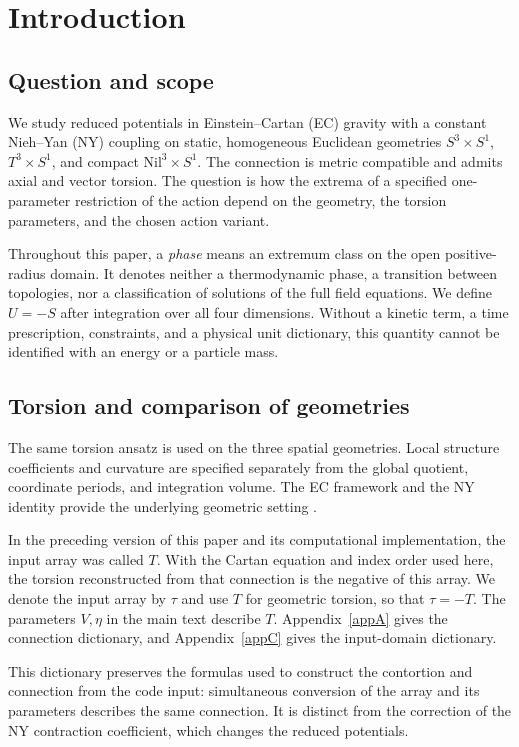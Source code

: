 \section{Introduction}\label{sec1}
\subsection{Question and scope}
We study reduced potentials in Einstein--Cartan (EC) gravity with a constant
Nieh--Yan (NY) coupling on static, homogeneous Euclidean geometries
$S^3\times S^1$, $T^3\times S^1$, and compact $\mathrm{Nil}^3\times S^1$.
The connection is metric compatible and admits axial and vector torsion.
The question is how the extrema of a specified one-parameter restriction of
the action depend on the geometry, the torsion parameters, and the chosen
action variant.

Throughout this paper, a \emph{phase} means an extremum class on the open
positive-radius domain. It denotes neither a thermodynamic phase,
a transition between topologies, nor a classification of solutions
of the full field equations. We define $U=-S$
after integration over all four dimensions. Without a kinetic term, a time
prescription, constraints, and a physical unit dictionary, this quantity
cannot be identified with an energy or a particle mass.

\subsection{Torsion and comparison of geometries}
The same torsion ansatz is used on the three spatial geometries.
Local structure coefficients and curvature are specified separately from
the global quotient, coordinate periods, and integration volume.
The EC framework and the NY identity provide the underlying geometric
setting \cite{Hehl1976,NiehYan1982,Chandia1997}.

In the preceding version of this paper and its computational implementation,
the input array was called $T$. With the Cartan equation and index order
used here, the torsion reconstructed from that connection is the negative
of this array. We denote the input array by $\tau$ and use $T$ for geometric
torsion, so that $\tau=-T$. The parameters $V,\eta$ in the main text describe
$T$. Appendix~\ref{appA} gives the connection dictionary, and
Appendix~\ref{appC} gives the input-domain dictionary.

This dictionary preserves the formulas used to construct the contortion
and connection from the code input: simultaneous conversion of the array
and its parameters describes the same connection. It is distinct from
the correction of the NY contraction coefficient, which changes the
reduced potentials.

